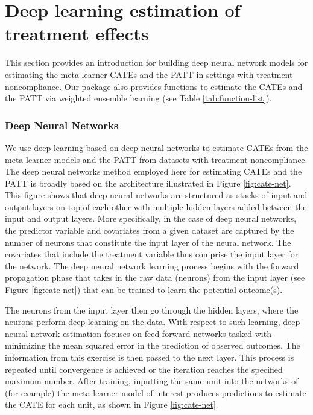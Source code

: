 \section{Deep learning estimation of treatment effects}\label{deep-learning-estimation-of-treatment-effects}

This section provides an introduction for building deep neural network
models for estimating the meta-learner CATEs and the PATT in settings
with treatment noncompliance. Our package also provides functions to
estimate the CATEs and the PATT via weighted ensemble learning (see
Table \ref{tab:function-list}).

\subsubsection{Deep Neural Networks}\label{deep-neural-networks}

We use deep learning based on deep neural networks to estimate CATEs
from the meta-learner models and the PATT from datasets with treatment
noncompliance. The deep neural networks method employed here for
estimating CATEs and the PATT is broadly based on the architecture
illustrated in Figure \ref{fig:cate-net}. This figure shows that deep neural networks are
structured as stacks of input and output layers on top of each other
with multiple hidden layers added between the input and output layers.
More specifically, in the case of deep neural networks, the predictor
variable and covariates from a given dataset are captured by the number
of neurons that constitute the input layer of the neural network. The
covariates that include the treatment variable thus comprise the input
layer for the network. The deep neural network learning process begins
with the forward propagation phase that takes in the raw data (neurons)
from the input layer (see Figure \ref{fig:cate-net}) that can be trained to learn the
potential outcome(s).

The neurons from the input layer then go through the hidden layers,
where the neurons perform deep learning on the data. With respect to
such learning, deep neural network estimation focuses on feed-forward
networks tasked with minimizing the mean squared error in the prediction
of observed outcomes. The information from this exercise is then passed
to the next layer. This process is repeated until convergence is
achieved or the iteration reaches the specified maximum number. After
training, inputting the same unit into the networks of (for example) the
meta-learner model of interest produces predictions to estimate the CATE
for each unit, as shown in Figure \ref{fig:cate-net}.

